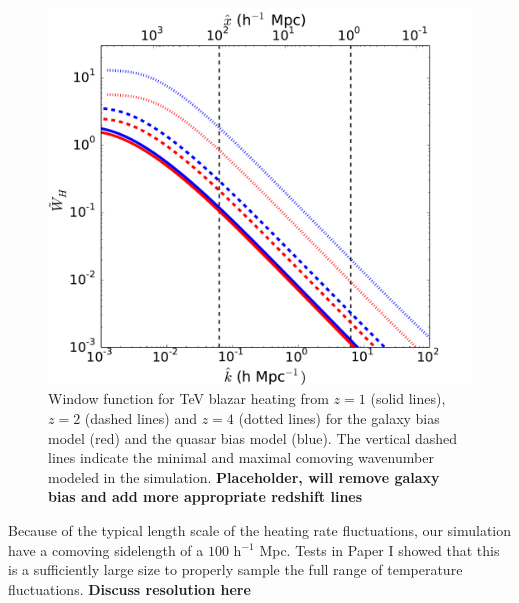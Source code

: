 \documentclass[numberedappendix]{emulateapj}
\newcommand\ALc[1]{{\color{red} \bf #1}} %
\begin{document}
\begin{figure}[h]
\centering
 \includegraphics[width = .45\textwidth ]{window_gal_qso}

\caption{Window function for TeV blazar heating from $z=1$ (solid lines), $z=2$ (dashed lines) and $z=4$ (dotted lines) for the galaxy bias model (red) and the quasar bias model (blue).  The vertical dashed lines indicate the minimal and maximal comoving wavenumber modeled in the simulation. \ALc{Placeholder, will remove galaxy bias and add more appropriate redshift lines}}
\label{fig:window}
\end{figure}

Because of the typical length scale of the heating rate fluctuations, our simulation have a comoving sidelength of  a $100$ h$^{-1}$ Mpc.  Tests in Paper I showed that this is a sufficiently large size to properly sample the full range of temperature fluctuations. \ALc{Discuss resolution here}



\end{document}
